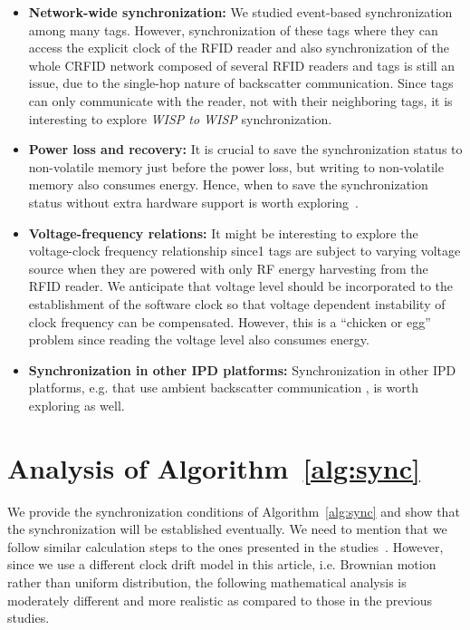 \documentclass[journal,draftcls,onecolumn,12pt,twoside]{IEEEtranTCOM}
\begin{document}
\begin{itemize}
\item \textbf{Network-wide synchronization:} We studied event-based synchronization among many tags. However, synchronization of these tags where they can access the explicit clock of the RFID reader and also synchronization of the whole CRFID network composed of several RFID readers and tags is still an issue, due to the single-hop nature of backscatter communication. Since tags can only communicate with the reader, not with their neighboring tags, it is interesting to explore \emph{WISP to WISP} synchronization. 
	
\item \textbf{Power loss and recovery:} It is crucial to save the synchronization status to non-volatile memory just before the power loss, but writing to non-volatile memory also consumes energy. Hence, when to save the synchronization status without extra hardware support is worth exploring~\cite{Buettner:2011:Dewdrop,Ransford:2011:Mementos,Lucia:2015:Execution,Colin:2016:Debugger}.

\item \textbf{Voltage-frequency relations:} It might be interesting to explore the voltage-clock frequency relationship since1 tags are subject to varying voltage source when they are powered with only RF energy harvesting from the RFID reader. We anticipate that voltage level should be incorporated to the establishment of the software clock so that voltage dependent instability of clock frequency can be compensated. However, this is a ``chicken or egg'' problem since reading the voltage level also consumes energy. 

\item \textbf{Synchronization in other IPD platforms:} Synchronization in other IPD platforms, e.g. that use ambient backscatter communication \cite{ambient_backscatter}, is worth exploring as well. 
\end{itemize}





\pagebreak
{}
\appendices
\section{Analysis of Algorithm~\ref{alg:sync}}

We provide the synchronization conditions of Algorithm~\ref{alg:sync} and show that the synchronization will be established eventually. We need to mention that we follow similar calculation steps to the ones presented in the studies~\cite{pi2015,Yildirim:Gradient:2016}. However, since we use a different clock drift model in this article, i.e. Brownian motion rather than uniform distribution, the following  mathematical analysis is moderately different and more realistic as compared to those in the previous studies. 
\end{document}
